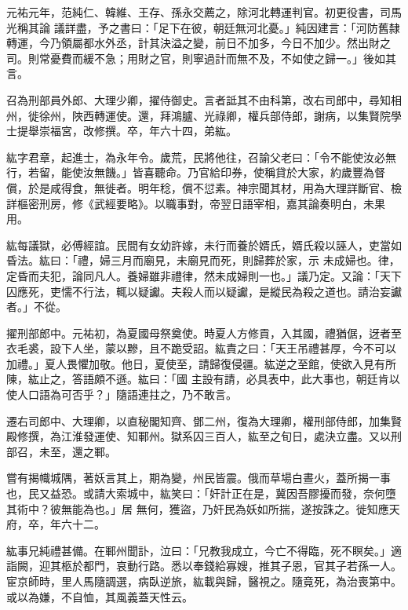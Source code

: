 \begin{pinyinscope}
 元祐元年，范純仁、韓維、王存、孫永交薦之，除河北轉運判官。初更役書，司馬光稱其論
 議詳盡，予之書曰：「足下在彼，朝廷無河北憂。」純因建言：「河防舊隸轉運，今乃領屬都水外丞，計其決溢之變，前日不加多，今日不加少。然出財之司。則常憂費而緩不急；用財之官，則寧過計而無不及，不如使之歸一。」後如其言。



 召為刑部員外郎、大理少卿，擢侍御史。言者詆其不由科第，改右司郎中，尋知相州，徙徐州，陜西轉運使。還，拜鴻臚、光祿卿，權兵部侍郎，謝病，以集賢院學士提舉崇福宮，改修撰。卒，年六十四，弟紘。



 紘字君章，起進士，為永年令。歲荒，民將他往，召諭父老曰：「令不能使汝必無行，若留，能使汝無饑。」皆喜聽命。乃官給印券，使稱貸於大家，約歲豐為督償，於是咸得食，無徙者。明年稔，償不愆素。神宗聞其材，用為大理詳斷官、檢詳樞密刑房，修《武經要略》。以職事對，帝翌日語宰相，嘉其論奏明白，未果用。



 紘每議獄，必傅經誼。民間有女幼許嫁，未行而養於婿氏，婿氏殺以誣人，吏當如昏法。紘曰：「禮，婦三月而廟見，未廟見而死，則歸葬於家，示
 未成婦也。律，定昏而夫犯，論同凡人。養婦雖非禮律，然未成婦則一也。」議乃定。又論：「天下囚應死，吏懦不行法，輒以疑讞。夫殺人而以疑讞，是縱民為殺之道也。請治妄讞者。」不從。



 擢刑部郎中。元祐初，為夏國母祭奠使。時夏人方修貢，入其國，禮猶倨，迓者至衣毛裘，設下人坐，蒙以黲，且不跪受詔。紘責之曰：「天王吊禮甚厚，今不可以加禮。」夏人畏懼加敬。他日，夏使至，請歸復侵疆。紘逆之至館，使欲入見有所陳，紘止之，答語頗不遜。紘曰：「國
 主設有請，必具表中，此大事也，朝廷肯以使人口語為可否乎？」隨語連拄之，乃不敢言。



 遷右司郎中、大理卿，以直秘閣知齊、鄧二州，復為大理卿，權刑部侍郎，加集賢殿修撰，為江淮發運使、知鄆州。獄系囚三百人，紘至之旬日，處決立盡。又以刑部召，未至，還之鄆。



 嘗有揭幟城隅，著妖言其上，期為變，州民皆震。俄而草場白晝火，蓋所揭一事也，民又益恐。或請大索城中，紘笑曰：「奸計正在是，冀因吾膠擾而發，奈何墮其術中？彼無能為也。」居
 無何，獲盜，乃奸民為妖如所揣，遂按誅之。徙知應天府，卒，年六十二。



 紘事兄純禮甚備。在鄆州聞訃，泣曰：「兄教我成立，今亡不得臨，死不瞑矣。」適詣闕，迎其柩於都門，哀動行路。悉以奉錢給寡嫂，推其子恩，官其子若孫一人。宦京師時，里人馬隨調選，病臥逆旅，紘載與歸，醫視之。隨竟死，為治喪第中。或以為嫌，不自恤，其風義蓋天性云。




\end{pinyinscope}
